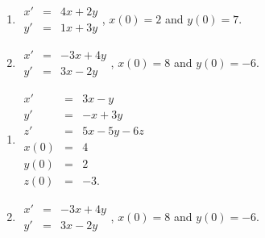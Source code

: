 \documentclass[10pt]{article}
\begin{document}
\begin{multicols}{2}
\begin{enumerate}
\setcounter{enumi}{\theenumCount}

\item $\begin{array}{ccc} x' & = & 4x + 2y \\ y' & = & 1x + 3y \end{array}$, $x(0) = 2$ and $y(0) = 7$. 

\item $\begin{array}{ccc} x' & = & -3x + 4y \\ y' & = & 3x - 2y \end{array}$, $x(0) = 8$ and $y(0) = -6$. 

\setcounter{enumCount}{\theenumi}
\end{enumerate} 
\end{multicols}
\vfill


\begin{multicols}{2}
\begin{enumerate}
\setcounter{enumi}{\theenumCount}

\item $\begin{array}{ccl} x' & = & 3x - y  \\ y' & = & -x + 3y  \\ z' & = & 5x - 5y - 6z \\ x(0) & = & 4 \\  y(0) & = & 2 \\ z(0) & = & -3. \end{array}$ \\  
\item $\begin{array}{ccc} x' & = & -3x + 4y \\ y' & = & 3x - 2y \end{array}$, $x(0) = 8$ and $y(0) = -6$. 

\setcounter{enumCount}{\theenumi}
\end{enumerate} 
\end{multicols}
\vfill
\end{document}
